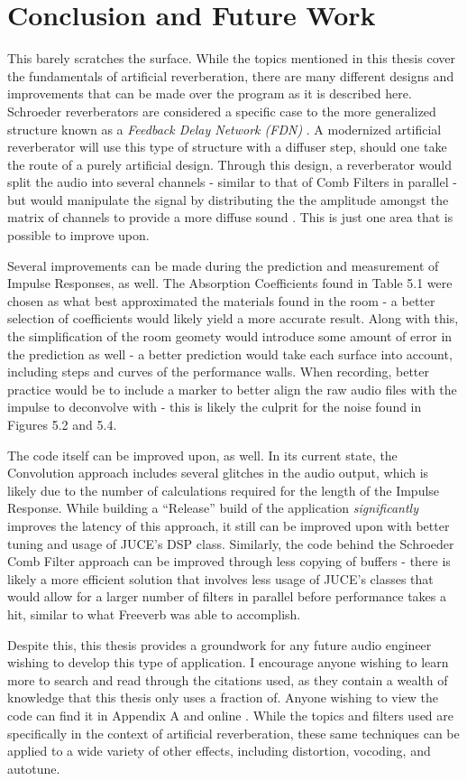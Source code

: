 \chapter{Conclusion and Future Work}
\hspace*{-0.15cm}This barely scratches the surface. While the topics mentioned in this thesis cover the fundamentals of artificial reverberation, there are many different designs and improvements that can be made over the program as it is described here. Schroeder reverberators are considered a specific case to the more generalized structure known as a \textit{Feedback Delay Network (FDN)} \cite{schlecht2016lossless}. A modernized artificial reverberator will use this type of structure with a diffuser step, should one take the route of a purely artificial design. Through this design, a reverberator would split the audio into several channels - similar to that of Comb Filters in parallel - but would manipulate the signal by distributing the the amplitude amongst the matrix of channels to provide a more diffuse sound \cite{writeReverb}. This is just one area that is possible to improve upon.

Several improvements can be made during the prediction and measurement of Impulse Responses, as well. The Absorption Coefficients found in Table 5.1 were chosen as what best approximated the materials found in the room - a better selection of coefficients would likely yield a more accurate result. Along with this, the simplification of the room geomety would introduce some amount of error in the prediction as well - a better prediction would take each surface into account, including steps and curves of the performance walls. When recording, better practice would be to include a marker to better align the raw audio files with the impulse to deconvolve with - this is likely the culprit for the noise found in Figures 5.2 and 5.4.

The code itself can be improved upon, as well. In its current state, the Convolution approach includes several glitches in the audio output, which is likely due to the number of calculations required for the length of the Impulse Response. While building a ``Release'' build of the application \textit{significantly} improves the latency of this approach, it still can be improved upon with better tuning and usage of JUCE's DSP class. Similarly, the code behind the Schroeder Comb Filter approach can be improved through less copying of buffers - there is likely a more efficient solution that involves less usage of JUCE's classes that would allow for a larger number of filters in parallel before performance takes a hit, similar to what Freeverb was able to accomplish.

Despite this, this thesis provides a groundwork for any future audio engineer wishing to develop this type of application. I encourage anyone wishing to learn more to search and read through the citations used, as they contain a wealth of knowledge that this thesis only uses a fraction of. Anyone wishing to view the code can find it in Appendix A and online \cite{CODE}. While the topics and filters used are specifically in the context of artificial reverberation, these same techniques can be applied to a wide variety of other effects, including distortion, vocoding, and autotune.
